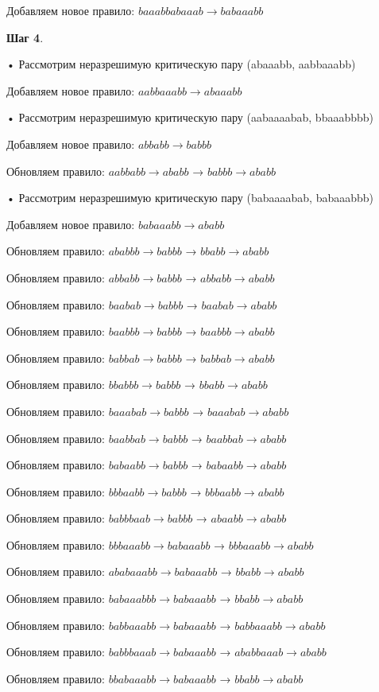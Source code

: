 \documentclass[a4paper, 14pt]{extarticle}
\begin{document}
        Добавляем новое правило: $baaabbabaaab \to babaaabb$


 \textbf{Шаг 4}.

   • Рассмотрим неразрешимую критическую пару (abaaabb, aabbaaabb)

        Добавляем новое правило: $aabbaaabb \to abaaabb$

   • Рассмотрим неразрешимую критическую пару (aabaaaabab, bbaaabbbb)

        Добавляем новое правило: $abbabb \to babbb$

    Обновляем правило: $aabbabb \to ababb$ → $babbb \to ababb$

   • Рассмотрим неразрешимую критическую пару (babaaaabab, babaaabbb)

        Добавляем новое правило: $babaaabb \to ababb$

    Обновляем правило: $ababbb \to babbb$ → $bbabb \to ababb$

    Обновляем правило: $abbabb \to babbb$ → $abbabb \to ababb$

    Обновляем правило: $baabab \to babbb$ → $baabab \to ababb$

    Обновляем правило: $baabbb \to babbb$ → $baabbb \to ababb$

    Обновляем правило: $babbab \to babbb$ → $babbab \to ababb$

    Обновляем правило: $bbabbb \to babbb$ → $bbabb \to ababb$

    Обновляем правило: $baaabab \to babbb$ → $baaabab \to ababb$

    Обновляем правило: $baabbab \to babbb$ → $baabbab \to ababb$

    Обновляем правило: $babaabb \to babbb$ → $babaabb \to ababb$

    Обновляем правило: $bbbaabb \to babbb$ → $bbbaabb \to ababb$

    Обновляем правило: $babbbaab \to babbb$ → $abaabb \to ababb$

    Обновляем правило: $bbbaaabb \to babaaabb$ → $bbbaaabb \to ababb$

    Обновляем правило: $ababaaabb \to babaaabb$ → $bbabb \to ababb$

    Обновляем правило: $babaaabbb \to babaaabb$ → $bbabb \to ababb$

    Обновляем правило: $babbaaabb \to babaaabb$ → $babbaaabb \to ababb$

    Обновляем правило: $babbbaaab \to babaaabb$ → $ababbaaab \to ababb$

    Обновляем правило: $bbabaaabb \to babaaabb$ → $bbabb \to ababb$
\end{document}
